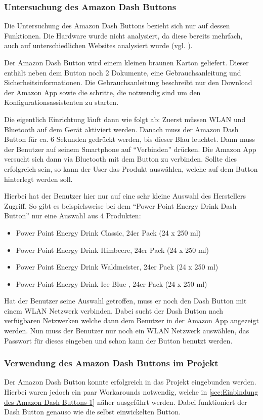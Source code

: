 \subsubsection{Untersuchung des Amazon Dash Buttons}
\label{sec:Untersuchung des Amazon Dash Buttons}
Die Untersuchung des Amazon Dash Buttons bezieht sich nur auf dessen Funktionen.
Die Hardware wurde nicht analysiert, da diese bereits mehrfach, auch auf unterschiedlichen Websites analysiert wurde (vgl. \cite{.17.05.2017}\cite{.17.05.2017b}).

Der Amazon Dash Button wird einem kleinen braunen Karton geliefert.
Dieser enthält neben dem Button noch 2 Dokumente, eine Gebrauchsanleitung und Sicherheitsinformationen.
Die Gebrauchsanleitung beschreibt nur den Download der Amazon App sowie die schritte, die notwendig sind um den Konfigurationsassistenten zu starten.

Die eigentlich Einrichtung läuft dann wie folgt ab:
Zuerst müssen WLAN und Bluetooth auf dem Gerät aktiviert werden.
Danach muss der Amazon Dash Button für ca. 6 Sekunden gedrückt werden, bis dieser Blau leuchtet.
Dann muss der Benutzer auf seinem Smartphone auf "`Verbinden"' drücken.
Die Amazon App versucht sich dann via Bluetooth mit dem Button zu verbinden.
Sollte dies erfolgreich sein, so kann der User das  Produkt auswählen, welche auf dem Button hinterlegt werden soll.

Hierbei hat der Benutzer hier nur auf eine sehr kleine Auswahl des Herstellers Zugriff.
So gibt es beispielsweise bei dem "`Power Point Energy Drink Dash Button"' nur eine Auswahl aus 4 Produkten:
\begin{itemize}
\item Power Point Energy Drink Classic, 24er Pack (24 x 250 ml)
\item Power Point Energy Drink Himbeere, 24er Pack (24 x 250 ml)
\item Power Point Energy Drink Waldmeister, 24er Pack (24 x 250 ml)
\item Power Point Energy Drink Ice Blue , 24er Pack (24 x 250 ml) 
\end{itemize}
Hat der Benutzer seine Auswahl getroffen, muss er noch den Dash Button mit einem WLAN Netzwerk verbinden.
Dabei sucht der Dash Button nach verfügbaren Netzwerken welche dann dem Benutzer in der Amazon App angezeigt werden.
Nun muss der Benutzer nur noch ein WLAN Netzwerk auswählen, das Passwort für dieses eingeben und schon kann der Button benutzt werden.

\subsubsection{Verwendung des Amazon Dash Buttons im Projekt}
\label{sec:Verwendung des Amazon Dash Buttons im Projekt}
Der Amazon Dash Button konnte erfolgreich in das Projekt eingebunden werden. Hierbei waren jedoch ein paar Workarounds notwendig, welche in \ref{sec:Einbindung des Amazon Dash Buttons-1} näher ausgeführt werden. Dabei funktioniert der Dash Button genauso wie die selbst einwickelten Button.